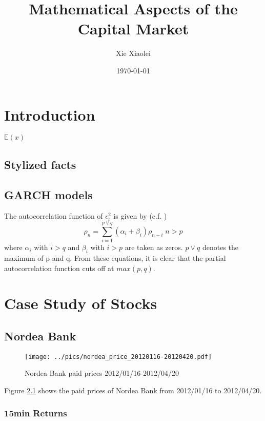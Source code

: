 \documentclass{book}
\title{Mathematical Aspects of the Capital Market}
\author{Xie Xiaolei}
\date{\today}
\begin{document}
\maketitle
\tableofcontents

\chapter{Introduction}
$\mathbb{E}(x)$

\section{Stylized facts}

\section{GARCH models}
The autocorrelation function of $\epsilon_t^2$ is given by
(c.f. \cite{Bollerslev87})
$$
\rho_n = \sum_{i=1}^{p \vee q} (\alpha_i + \beta_i) \rho_{n-i}
\;n > p
$$
where $\alpha_i$ with $i > q$ and $\beta_i$ with $i > p$ are taken as
zeros. $p \vee q$ denotes the maximum of p and q. From these
equations, it is clear that the partial autocorrelation function cuts
off at $max(p, q)$.


\chapter{Case Study of Stocks}
\section{Nordea Bank}
\begin{figure}[ht]
  \centering
  \texttt{[image: ../pics/nordea\_price\_20120116-20120420.pdf]}
  \caption{Nordea Bank paid prices 2012/01/16-2012/04/20}
  \label{fig:Nordea}
\end{figure}
Figure \ref{fig:Nordea} shows the paid prices of Nordea Bank from
2012/01/16 to 2012/04/20.

\subsection{15min Returns}
\end{document}
